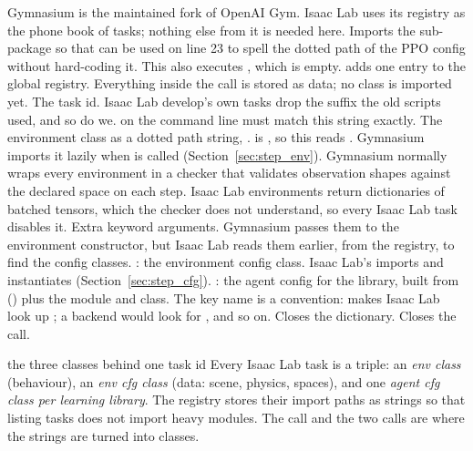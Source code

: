 \begin{explain}
 Gymnasium is the maintained fork of OpenAI Gym. Isaac Lab uses its
  registry as the phone book of tasks; nothing else from it is needed here.
 Imports the  sub-package so that 
  can be used on line 23 to spell the dotted path of the PPO config
  without hard-coding it. This also executes , which
  is empty.
  adds one entry to the global registry. Everything
  inside the call is stored as data; no class is imported yet.
 The task id. Isaac Lab develop's own tasks drop the  suffix
  the old scripts used, and so do we. 
  on the command line must match this string exactly.
 The environment class as a dotted path string,
  .  is ,
  so this reads .
  Gymnasium imports it lazily when  is called
  (Section~\ref{sec:step_env}).
 Gymnasium normally wraps every environment in a checker that
  validates observation shapes against the declared space on each step. Isaac
  Lab environments return dictionaries of batched tensors, which the checker
  does not understand, so every Isaac Lab task disables it.
 Extra keyword arguments. Gymnasium passes them to the environment
  constructor, but Isaac Lab reads them earlier, from the registry, to find
  the config classes.
 : the environment config class. Isaac Lab's
   imports
   and instantiates
   (Section~\ref{sec:step_cfg}).
 : the agent config for the
   library, built from 
  () plus the module and class. The key
  name is a convention:  makes Isaac Lab look up
  ; a  backend would look for
  , and so on.
 Closes the  dictionary.
 Closes the  call.
\end{explain}

\begin{isaacbox}{the three classes behind one task id}
Every Isaac Lab task is a triple: an \emph{env class} (behaviour), an
\emph{env cfg class} (data: scene, physics, spaces), and one \emph{agent cfg
class per learning library}. The registry stores their import paths as
strings so that listing tasks does not import heavy modules. The
 call and the two  calls are where
the strings are turned into classes.
\end{isaacbox}
